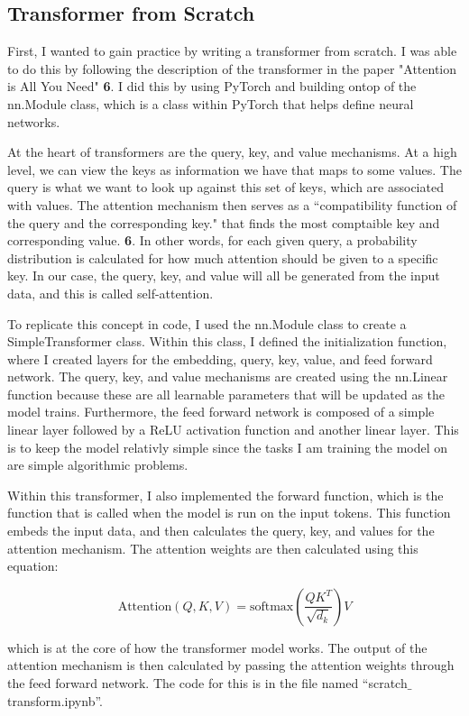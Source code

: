 \documentclass{article}
\begin{document}
\subsection{Transformer from Scratch}

First, I wanted to gain practice by writing a transformer from scratch. I was able to do this by following the description of the transformer in the paper "Attention is All You Need" \textbf{6}. I did this by using PyTorch and building ontop of the nn.Module class, which is a class within PyTorch that helps define neural networks. 

At the heart of transformers are the query, key, and value mechanisms. At a high level, we can view the keys as information we have that maps to some values. The query is what we want to look up against this set of keys, which are associated with values. The attention mechanism then serves as a ``compatibility function of the query and the corresponding key." that finds the most comptaible key and corresponding value. \textbf{6}. In other words, for each given query, a probability distribution is calculated for how much attention should be given to a specific key. In our case, the query, key, and value will all be generated from the input data, and this is called self-attention. 

To replicate this concept in code, I used the nn.Module class to create a SimpleTransformer class. Within this class, I defined the initialization function,
where I created layers for the embedding, query, key, value, and feed forward network. The query, key, and value mechanisms are created using the nn.Linear function because these are all learnable parameters that will be updated as the model trains. Furthermore, the feed forward network is composed of a simple linear layer followed by a ReLU activation function and another linear layer. This is to keep the model relativly simple since the tasks I am training the model on are simple algorithmic problems.

Within this transformer, I also implemented the forward function, which is the function that is called when the model is run on the input tokens. This function embeds the input data, and then calculates the query, key, and values for the attention mechanism. The attention weights are then calculated using this equation:

$$
\text{Attention}(Q, K, V) = \text{softmax}\left(\frac{QK^T}{\sqrt{d_k}}\right)V
$$

which is at the core of how the transformer model works. The output of the attention mechanism is then calculated by passing the attention weights through the feed forward network. The code for this is in the file named ``scratch$\_$transform.ipynb''.
\end{document}

